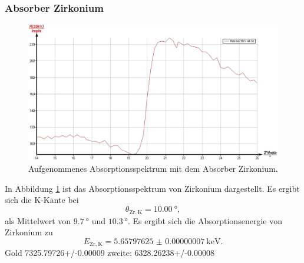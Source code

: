 \subsubsection{Absorber Zirkonium}
\begin{figure}
	\includegraphics[width=1.0\textwidth]{nIKO_und_jULIAN_ÜLADS/zirkonium.jpg}
	\caption{Aufgenommenes Absorptionsspektrum mit dem Absorber Zirkonium.}
	\label{fig:zirkonium_absorber}
\end{figure}
In Abbildung \ref{fig:zirkonium_absorber} ist das Absorptionsspektrum von Zirkonium 
dargestellt.
Es ergibt sich die K-Kante bei
\begin{equation*}
	\theta_{\mathrm{Zr,K}} = \SI{10,00}{\degree} \mathrm{,}
\end{equation*}
als Mittelwert von $\SI{9,7}{\degree}$ und $\SI{10,3}{\degree}$.
Es ergibt sich die Absorptionsenergie von Zirkonium zu
\begin{equation*}
	E_{\mathrm{Zr,K}} = \SI{5.65797625(7)}{\kilo\electronvolt} \mathrm{.}
\end{equation*}
Gold 7325.79726+/-0.00009 zweite: 6328.26238+/-0.00008

\FloatBarrier
